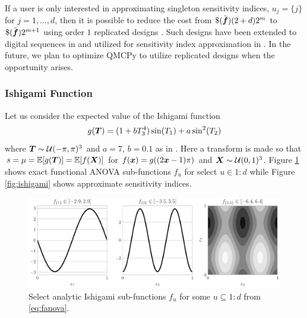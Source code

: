 \documentclass{article}[12pt]
\begin{document}
If a user is only interested in approximating singleton sensitivity indices, $u_j = \{j\}$ for $j=1,\dots,d$, then it is possible to reduce the cost from $\$(\tilde{\bf})(2+d)2^m$ to $\$(\tilde{\bf})2^{m+1}$ using order $1$ replicated designs \cite{alex2008comparison,tissot2015randomized}. Such designs have been extended to  digital sequences in \cite{replicated_designs_sobol_seq} and utilized for sensitivity index approximation in \cite{reliable_sobol_indices_approx}. In the future, we plan to optimize QMCPy to utilize replicated designs when the opportunity arises.

\subsubsection{Ishigami Function}

Let us consider the expected value of the Ishigami function \cite{ishigami1990importance}
\begin{equation}
    g(\bT) = (1+bT_3^4)\sin(T_1)+a\sin^2(T_2)
    \label{eq:ishigami}
\end{equation}
where $\bT \sim \calU(-\pi,\pi)^3$ and $a=7$, $b=0.1$ as in \cite{crestaux2007polynomial,marrel2009calculations}. Here a transform is made so that $s = \mu = \bbE[g(\bT)]=\bbE[f(\bX)]$ for $f(\bx) = g((2\bx-1)\pi)$ and $\bX \sim \calU(0,1)^3$.  Figure \ref{fig:ishigami_fu} shows exact functional ANOVA sub-functions $f_u$ for select $u \in 1:d$ while Figure \ref{fig:ishigami} shows approximate sensitivity indices.

\begin{figure}[H]
    \centering
    \includegraphics[width=.8\textwidth]{figs/ishigami_fu.pdf}
    \caption{Select analytic Ishigami sub-functions $f_u$ for some $u \subseteq 1:d$ from \eqref{eq:fanova}.}
    \label{fig:ishigami_fu}
\end{figure}
\end{document}

